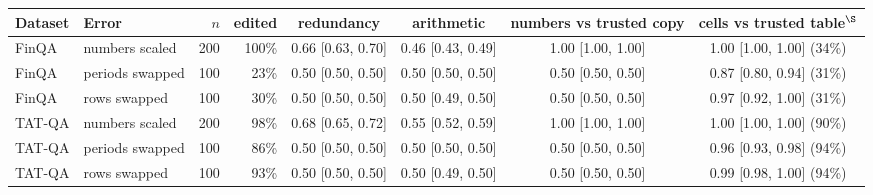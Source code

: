 \begin{tabular}{@{}l l r r c c c c@{}}
\toprule
Dataset & Error & $n$ & edited & redundancy & arithmetic & numbers vs trusted copy & cells vs trusted table$^\S$ \\
\midrule
FinQA & numbers scaled & 200 & 100\% & 0.66 \small[0.63, 0.70] & 0.46 \small[0.43, 0.49] & 1.00 \small[1.00, 1.00] & 1.00 \small[1.00, 1.00] (34\%) \\
FinQA & periods swapped & 100 & 23\% & 0.50 \small[0.50, 0.50] & 0.50 \small[0.50, 0.50] & 0.50 \small[0.50, 0.50] & 0.87 \small[0.80, 0.94] (31\%) \\
FinQA & rows swapped & 100 & 30\% & 0.50 \small[0.50, 0.50] & 0.50 \small[0.49, 0.50] & 0.50 \small[0.50, 0.50] & 0.97 \small[0.92, 1.00] (31\%) \\
TAT-QA & numbers scaled & 200 & 98\% & 0.68 \small[0.65, 0.72] & 0.55 \small[0.52, 0.59] & 1.00 \small[1.00, 1.00] & 1.00 \small[1.00, 1.00] (90\%) \\
TAT-QA & periods swapped & 100 & 86\% & 0.50 \small[0.50, 0.50] & 0.50 \small[0.50, 0.50] & 0.50 \small[0.50, 0.50] & 0.96 \small[0.93, 0.98] (94\%) \\
TAT-QA & rows swapped & 100 & 93\% & 0.50 \small[0.50, 0.50] & 0.50 \small[0.49, 0.50] & 0.50 \small[0.50, 0.50] & 0.99 \small[0.98, 1.00] (94\%) \\
\bottomrule
\end{tabular}